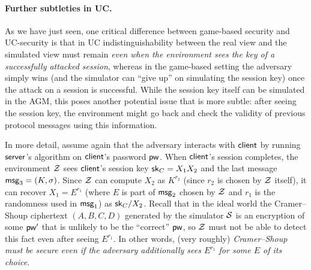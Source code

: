 \paragraph{Further subtleties in UC.}
As we have just seen, one critical difference between game-based security and UC-security is that in UC indistinguishability between the real view and the simulated view must remain \emph{even when the environment sees the key of a successfully attacked session}, whereas in the game-based setting the adversary simply wins (and the simulator can ``give up'' on simulating the session key) once the attack on a session is successful. While the session key itself can be simulated in the AGM, this poses another potential issue that is more subtle: after seeing the session key, the environment might go back and check the validity of previous protocol messages using this information.

In more detail, assume again that the adversary interacts with $\mathsf{client}$ by running $\mathsf{server}$'s algorithm on $\mathsf{client}$'s password $\mathsf{pw}$. When $\mathsf{client}$'s session completes, the environment $\mathcal{Z}$ sees $\mathsf{client}$'s session key $\mathsf{sk}_C = X_1X_2$ and the last message $\mathsf{msg}_{3} = (K,\sigma)$. Since $\mathcal{Z}$ can compute $X_2$ as $K^{r_2}$ (since $r_2$ is chosen by $\mathcal{Z}$ itself), it can recover $X_1 = E^{r_1}$ (where $E$ is part of $\mathsf{msg}_{2}$ chosen by $\mathcal{Z}$ and $r_1$ is the randomness used in $\mathsf{msg}_{1}$) as $\mathsf{sk}_C/X_2$. Recall that in the ideal world the Cramer--Shoup ciphertext $(A,B,C,D)$ generated by the simulator $\mathcal{S}$ is an encryption of some $\mathsf{pw}'$ that is unlikely to be the ``correct'' $\mathsf{pw}$, so $\mathcal{Z}$ must not be able to detect this fact even after seeing $E^{r_1}$. In other words, (very roughly) \emph{Cramer--Shoup must be secure even if the adversary additionally sees $E^{r_1}$ for some $E$ of its choice}.

